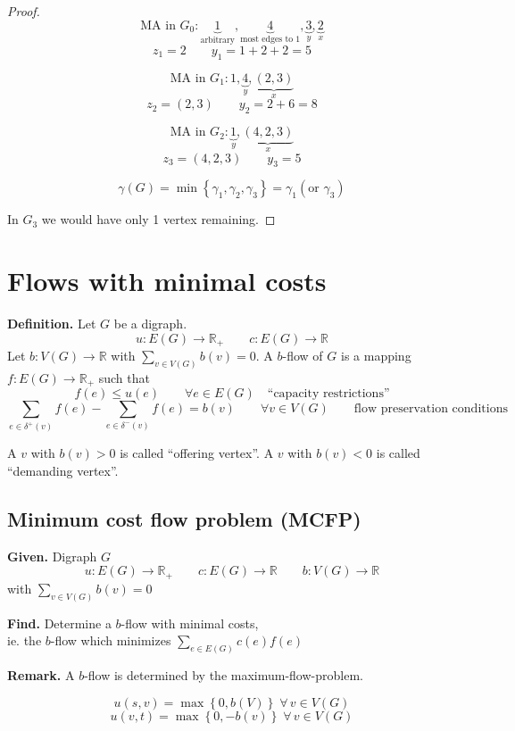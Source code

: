 \documentclass{article}
\newcommand{\set}[1]{\left\{#1\right\}}
\newcommand{\given}[1]{\textbf{Given.} #1\par}
\newcommand{\find}[1]{\textbf{Find.} #1\par}
\newcommand{\fall}{\;\forall\,}
\begin{document}
\begin{proof}
  \[
    \text{MA in $G_0$}:
      \underbrace{1}_{\text{arbitrary}},
      \underbrace{4}_{\text{most edges to 1}},
      \underbrace{3}_{y},
      \underbrace{2}_{x}
  \] \[
    z_1 = 2 \qquad y_1 = 1 + 2 + 2 = 5
  \]

  \[
    \text{MA in $G_1$}:
      1,
      \underbrace{4}_{y},
      \underbrace{(2,3)}_{x}
  \] \[
    z_2 = (2, 3) \qquad y_2 = 2 + 6 = 8
  \]

  \[
    \text{MA in $G_2$}:
      \underbrace{1}_y,
      \underbrace{(4,2,3)}_{x}
  \] \[
    z_3 = (4, 2, 3) \qquad y_3 = 5
  \]

  \[
    \gamma(G) = \min\set{\gamma_1, \gamma_2, \gamma_3} = \gamma_1 (\text{or } \gamma_3)
  \]

  In $G_3$ we would have only 1 vertex remaining.
\end{proof}

\section{Flows with minimal costs}
%
\textbf{Definition.}
  Let $G$ be a digraph.
  \[ u: E(G) \rightarrow \mathbb{R}_+ \qquad c: E(G) \rightarrow \mathbb{R} \]
  Let $b: V(G) \rightarrow \mathbb{R}$ with $\sum_{v \in V(G)} b(v) = 0$.
  A $b$-flow of $G$ is a mapping $f: E(G) \rightarrow \mathbb{R}_+$ such that
  \[ f(e) \leq u(e) \qquad \forall e \in E(G) \quad \text{``capacity restrictions''} \]
  \[
    \sum_{e \in \delta^+(v)} f(e) - \sum_{e \in \delta^-(v)} f(e)
      = b(v) \qquad \forall v \in V(G)
      \qquad \text{flow preservation conditions}
  \]

A $v$ with $b(v) > 0$ is called ``offering vertex''.
A $v$ with $b(v) < 0$ is called ``demanding vertex''.

\subsection{Minimum cost flow problem (MCFP)}
%
\given{Digraph $G$
\[ u: E(G) \rightarrow \mathbb{R}_+
  \qquad c: E(G) \rightarrow \mathbb{R}
  \qquad b: V(G) \rightarrow \mathbb{R}
\] with $\sum_{v \in V(G)} b(v) = 0$}
\find{Determine a $b$-flow with minimal costs, \\
  ie. the $b$-flow which minimizes $\sum_{e \in E(G)} c(e) f(e)$
}

\textbf{Remark.}
  A $b$-flow is determined by the maximum-flow-problem.

\[
  u(s, v) = \max{\set{0, b(V)}} \fall v \in V(G)
\] \[
  u(v, t) = \max{\set{0, -b(v)}} \fall v \in V(G)
\]
\end{document}
